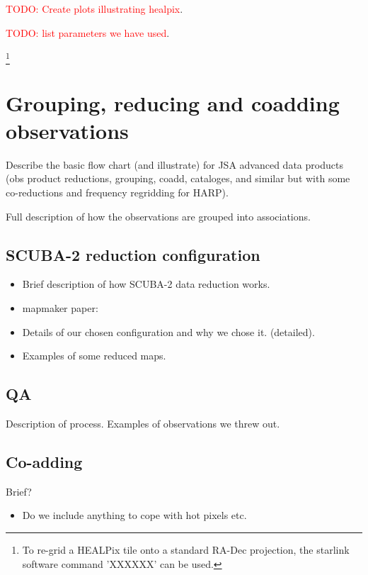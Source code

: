 \documentclass[usenatbib]{mn2e}
\newcommand{\todo}[1]{\textcolor{red}{TODO: #1}}
\begin{document}
\todo{Create plots illustrating healpix}.

\todo{list parameters we have used}.

\footnote{To re-grid a HEALPix tile onto a standard RA-Dec projection,
the starlink software command 'XXXXXX' can be used.}

\citep{2005ApJ...622..759G}

\citep{2007MNRAS.381..865C}

\section{Grouping, reducing and coadding observations}
Describe the basic flow chart (and illustrate) for JSA advanced data
products (obs product reductions, grouping, coadd, cataloges, and
similar but with some co-reductions and frequency regridding for
HARP).

Full description of how the observations are grouped into
associations.



\subsection{SCUBA-2 reduction configuration}

\citep{2013MNRAS.430.2513H}

\begin{itemize}
\item Brief description of how SCUBA-2 data reduction works.
\item mapmaker paper: \citep{2013MNRAS.430.2545C}
\item Details of our chosen configuration and why we chose it. (detailed).
\item Examples of some reduced maps.
\end{itemize}


\subsection{QA}
Description of process. Examples of observations we threw out.


\subsection{Co-adding}
Brief?
\begin{itemize}
\item Do we include anything to cope with hot pixels etc.
\end{itemize}
\end{document}
